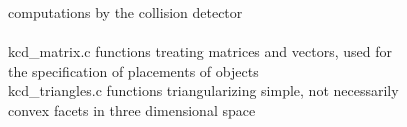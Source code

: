 \begin{tabbing}
\>\>                          computations by the collision detector\\
\> \> \\
\> kcd\_matrix.c          \>     functions treating matrices and vectors, used for\\
\>\>                          the specification of placements of objects\\
\> kcd\_triangles.c    \>        functions triangularizing simple, not necessarily\\
\>\>                          convex facets in three dimensional space
\vspace{-4mm}
\end{tabbing}

